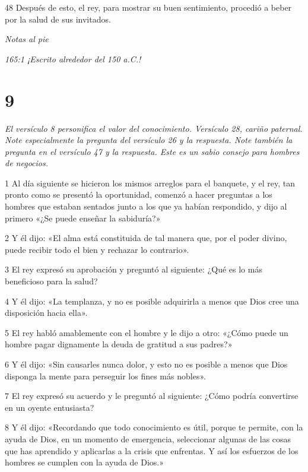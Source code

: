 \par 48 Después de esto, el rey, para mostrar su buen sentimiento, procedió a beber por la salud de sus invitados.

\par \textit{Notas al pie}

\par \textit{165:1 ¡Escrito alrededor del 150 a.C.!}

\chapter{9}

\par \textit{El versículo 8 personifica el valor del conocimiento. Versículo 28, cariño paternal. Note especialmente la pregunta del versículo 26 y la respuesta. Note también la pregunta en el versículo 47 y la respuesta. Este es un sabio consejo para hombres de negocios.}

\par 1 Al día siguiente se hicieron los mismos arreglos para el banquete, y el rey, tan pronto como se presentó la oportunidad, comenzó a hacer preguntas a los hombres que estaban sentados junto a los que ya habían respondido, y dijo al primero «¿Se puede enseñar la sabiduría?»

\par 2 Y él dijo: «El alma está constituida de tal manera que, por el poder divino, puede recibir todo el bien y rechazar lo contrario».

\par 3 El rey expresó su aprobación y preguntó al siguiente: ¿Qué es lo más beneficioso para la salud?

\par 4 Y él dijo: «La templanza, y no es posible adquirirla a menos que Dios cree una disposición hacia ella».

\par 5 El rey habló amablemente con el hombre y le dijo a otro: «¿Cómo puede un hombre pagar dignamente la deuda de gratitud a sus padres?»

\par 6 Y él dijo: «Sin causarles nunca dolor, y esto no es posible a menos que Dios disponga la mente para perseguir los fines más nobles».

\par 7 El rey expresó su acuerdo y le preguntó al siguiente: ¿Cómo podría convertirse en un oyente entusiasta?

\par 8 Y él dijo: «Recordando que todo conocimiento es útil, porque te permite, con la ayuda de Dios, en un momento de emergencia, seleccionar algunas de las cosas que has aprendido y aplicarlas a la crisis que enfrentas. Y así los esfuerzos de los hombres se cumplen con la ayuda de Dios.»

